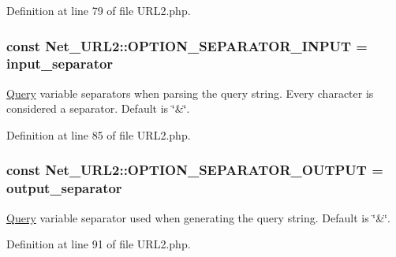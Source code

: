 Definition at line 79 of file U\+R\+L2.\+php.

\subsubsection[{\texorpdfstring{O\+P\+T\+I\+O\+N\+\_\+\+S\+E\+P\+A\+R\+A\+T\+O\+R\+\_\+\+I\+N\+P\+UT}{OPTION_SEPARATOR_INPUT}}]{\setlength{\rightskip}{0pt plus 5cm}const Net\+\_\+\+U\+R\+L2\+::\+O\+P\+T\+I\+O\+N\+\_\+\+S\+E\+P\+A\+R\+A\+T\+O\+R\+\_\+\+I\+N\+P\+UT = \textquotesingle{}input\+\_\+separator\textquotesingle{}}\hypertarget{classNet__URL2_af5b6f766fae9600b3938e33c32893bce}{}\label{classNet__URL2_af5b6f766fae9600b3938e33c32893bce}
\hyperlink{classQuery}{Query} variable separators when parsing the query string. Every character is considered a separator. Default is \char`\"{}\&\char`\"{}. 

Definition at line 85 of file U\+R\+L2.\+php.

\subsubsection[{\texorpdfstring{O\+P\+T\+I\+O\+N\+\_\+\+S\+E\+P\+A\+R\+A\+T\+O\+R\+\_\+\+O\+U\+T\+P\+UT}{OPTION_SEPARATOR_OUTPUT}}]{\setlength{\rightskip}{0pt plus 5cm}const Net\+\_\+\+U\+R\+L2\+::\+O\+P\+T\+I\+O\+N\+\_\+\+S\+E\+P\+A\+R\+A\+T\+O\+R\+\_\+\+O\+U\+T\+P\+UT = \textquotesingle{}output\+\_\+separator\textquotesingle{}}\hypertarget{classNet__URL2_a84719f522747f51638a9c8474d4abc39}{}\label{classNet__URL2_a84719f522747f51638a9c8474d4abc39}
\hyperlink{classQuery}{Query} variable separator used when generating the query string. Default is \char`\"{}\&\char`\"{}. 

Definition at line 91 of file U\+R\+L2.\+php.

